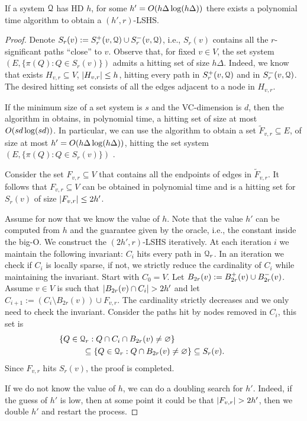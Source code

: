 \begin{proposition}
If a system $\mathcal{Q}$ has HD $h$, for some $h'=O(h\Delta\log(h\Delta))$ there exists a polynomial time algorithm to obtain a $(h',r)$-LSHS.	
\end{proposition}
\begin{proof}
Denote $S_r(v):=S^+_r(v,\mathcal{Q})\cup S^-_r(v,\mathcal{Q})$, i.e., $S_r(v)$ contains all the $r$-significant paths ``close'' to $v$. 
Observe that, for fixed $v\in V$, the set system $(E,\{\pi(Q):Q \in S_r(v)\})$ admits a hitting set of size $h\Delta$.
Indeed, we know that exists $H_{v,r}\subseteq V$, $\lvert H_{v,r}\rvert\leq h$, hitting every path in $S^+_r(v,\mathcal{Q})$ and in $S^-_r(v,\mathcal{Q})$.
The desired hitting set consists of all the edges adjacent to a node in $H_{v,r}$.

If the minimum size of a set system is $s$ and the VC-dimension is $d$, then the algorithm in  obtains, in polynomial time, a hitting set of size at most $O(sd\log(sd))$.
In particular, we can use the algorithm to obtain a set $\tilde F_{v,r}\subseteq E$, of size at most $h'=O(h\Delta\log(h\Delta))$, hitting the set system $(E,\{\pi(Q):Q \in S_r(v)\})$ .

Consider the set $F_{v,r}\subseteq V$ that contains all the endpoints of edges in $\tilde F_{v,r}$.
It follows that $F_{v,r}\subseteq V$ can be obtained in polynomial time and is a hitting set for $S_r(v)$ of size $\lvert F_{v,r}\rvert\leq 2h'$.

Assume for now that we know the value of $h$.
Note that the value $h'$ can be computed from $h$ and the guarantee given by the oracle, i.e., the constant inside the big-O.
We construct the $(2h',r)$-LSHS iteratively.
At each iteration $i$ we maintain the following invariant: $C_i$ hits every path in $\mathcal{Q}_r$.
In an iteration we check if $C_i$ is locally sparse, if not, we strictly reduce the cardinality of $C_i$ while maintaining the invariant.
Start with $C_0=V$. 
Let $B_{2r}(v):=B^+_{2r}(v)\cup B^-_{2r}(v)$.
Assume $v\in V$ is such that $\lvert B_{2r}(v)\cap C_i\rvert>2h'$ and let $C_{i+1}:=(C_i\setminus B_{2r}(v))\cup F_{v,r} $.
The cardinality strictly decreases and we only need to check the invariant.
Consider the paths hit by nodes removed in $C_i$, this set is
\begin{align*}
&\hspace{-1cm}\{Q\in\calQ_r: Q\cap C_i\cap B_{2r}(v)\neq \varnothing\}\\
&\subseteq \{Q\in\calQ_r: Q\cap B_{2r}(v)\neq \varnothing\} \subseteq S_r(v).
\end{align*}
Since $F_{v,r}$ hits $S_r(v)$, the proof is completed.

If we do not know the value of $h$, we can do a doubling search for $h'$. 
Indeed, if the guess of $h'$ is low, then at some point it could be that $\lvert F_{v,r}\rvert>2h'$, then we double $h'$ and restart the process.
\end{proof}
